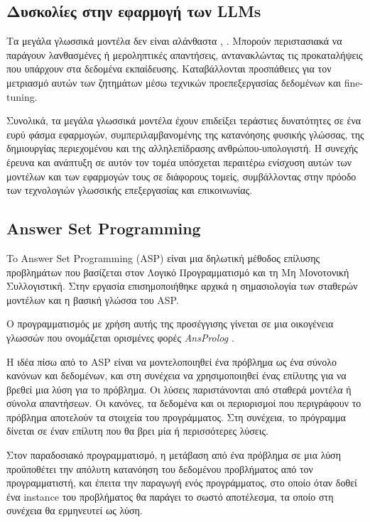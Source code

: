 \documentclass[10pt,leqno]{amsart}
\begin{document}
\subsection{Δυσκολίες στην εφαρμογή των LLMs}

Τα μεγάλα γλωσσικά μοντέλα δεν είναι αλάνθαστα \cite{Raj2023}, \cite{Ruis2023}. Μπορούν περιστασιακά να παράγουν λανθασμένες ή μεροληπτικές απαντήσεις, αντανακλώντας τις προκαταλήψεις που υπάρχουν στα δεδομένα εκπαίδευσης. Καταβάλλονται προσπάθειες για τον μετριασμό αυτών των ζητημάτων μέσω τεχνικών προεπεξεργασίας δεδομένων και fine-tuning.

Συνολικά, τα μεγάλα γλωσσικά μοντέλα έχουν επιδείξει τεράστιες δυνατότητες σε ένα ευρύ φάσμα εφαρμογών, συμπεριλαμβανομένης της κατανόησης φυσικής γλώσσας, της δημιουργίας περιεχομένου και της αλληλεπίδρασης ανθρώπου-υπολογιστή. Η συνεχής έρευνα και ανάπτυξη σε αυτόν τον τομέα υπόσχεται περαιτέρω ενίσχυση αυτών των μοντέλων και των εφαρμογών τους σε διάφορους τομείς, συμβάλλοντας στην πρόοδο των τεχνολογιών γλωσσικής επεξεργασίας και επικοινωνίας.

\subsection{Answer Set Programming}
To Answer Set Programming (ASP) \cite{Eiter2009} είναι μια δηλωτική μέθοδος επίλυσης προβλημάτων που βασίζεται στον Λογικό Προγραμματισμό και τη Μη Μονοτονική Συλλογιστική.  
Στην εργασία \cite{Gelfond2000} επισημοποιήθηκε αρχικά η σημασιολογία των σταθερών μοντέλων και η βασική γλώσσα του ASP.

Ο προγραμματισμός με χρήση αυτής της προσέγγισης γίνεται σε μια οικογένεια γλωσσών που ονομάζεται ορισμένες φορές \textit{AnsProlog} \cite{Gelfond2002}.

Η ιδέα πίσω από το ASP είναι να μοντελοποιηθεί ένα πρόβλημα ως ένα σύνολο κανόνων και δεδομένων, και στη συνέχεια να χρησιμοποιηθεί ένας επίλυτης για να βρεθεί μια λύση για το πρόβλημα. Οι λύσεις παριστάνονται από σταθερά μοντέλα ή σύνολα απαντήσεων. Οι κανόνες, τα δεδομένα και οι περιορισμοί που περιγράφουν το πρόβλημα αποτελούν τα στοιχεία του προγράμματος. Στη συνέχεια, το πρόγραμμα δίνεται σε έναν επίλυτη που θα βρει μία ή περισσότερες λύσεις. 

Στον παραδοσιακό προγραμματισμό, η μετάβαση από ένα πρόβλημα σε μια λύση προϋποθέτει την απόλυτη κατανόηση του δεδομένου προβλήματος από τον προγραμματιστή, και έπειτα την παραγωγή ενός προγράμματος, στο οποίο όταν δοθεί ένα instance του προβλήματος θα παράγει το σωστό αποτέλεσμα, τα οποίο στη συνέχεια θα ερμηνευτεί ως λύση.
\end{document}
